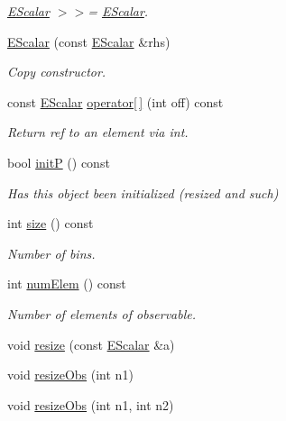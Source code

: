 \begin{DoxyCompactItemize}
\begin{DoxyCompactList}\small\item\em \mbox{\hyperlink{classENSEM_1_1EScalar}{E\+Scalar}} $>$$>$= \mbox{\hyperlink{classENSEM_1_1EScalar}{E\+Scalar}}. \end{DoxyCompactList}\item 
\mbox{\hyperlink{classENSEM_1_1EScalar_a002ac4bc9bc6e5ad476613e4edaa827a}{E\+Scalar}} (const \mbox{\hyperlink{classENSEM_1_1EScalar}{E\+Scalar}} \&rhs)
\begin{DoxyCompactList}\small\item\em Copy constructor. \end{DoxyCompactList}\item 
const \mbox{\hyperlink{classENSEM_1_1EScalar}{E\+Scalar}} \mbox{\hyperlink{classENSEM_1_1EScalar_a20c80375941641aca36355253b3479ac}{operator\mbox{[}$\,$\mbox{]}}} (int off) const
\begin{DoxyCompactList}\small\item\em Return ref to an element via int. \end{DoxyCompactList}\item 
bool \mbox{\hyperlink{classENSEM_1_1EScalar_ac5b2f0fbee6aa61f80bcd2d0b4d5188c}{initP}} () const
\begin{DoxyCompactList}\small\item\em Has this object been initialized (resized and such) \end{DoxyCompactList}\item 
int \mbox{\hyperlink{classENSEM_1_1EScalar_a314f162d71b15a8eb7e3382a274aa12b}{size}} () const
\begin{DoxyCompactList}\small\item\em Number of bins. \end{DoxyCompactList}\item 
int \mbox{\hyperlink{classENSEM_1_1EScalar_a63584568dc8b1817a57656cc072205b2}{num\+Elem}} () const
\begin{DoxyCompactList}\small\item\em Number of elements of observable. \end{DoxyCompactList}\item 
void \mbox{\hyperlink{classENSEM_1_1EScalar_aff8eff3acd3686a6ae0b1a1a0dfd6426}{resize}} (const \mbox{\hyperlink{classENSEM_1_1EScalar}{E\+Scalar}} \&a)
\item 
void \mbox{\hyperlink{classENSEM_1_1EScalar_af9faf602be10ce072be3fc532a7e17fe}{resize\+Obs}} (int n1)
\item 
void \mbox{\hyperlink{classENSEM_1_1EScalar_ad4fe54c2fb8a3420e1e452228d8d40b1}{resize\+Obs}} (int n1, int n2)

\end{DoxyCompactItemize}
